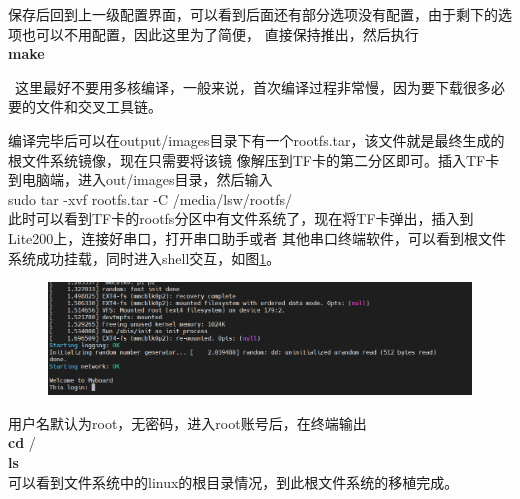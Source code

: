保存后回到上一级配置界面，可以看到后面还有部分选项没有配置，由于剩下的选项也可以不用配置，因此这里为了简便，
直接保持推出，然后执行\\
\textbf{make}
\begin{tcolorbox}[colback=red!5!white,colframe=red!75!black]
	\faWarning\  
	这里最好不要用多核编译，一般来说，首次编译过程非常慢，因为要下载很多必要的文件和交叉工具链。
\end{tcolorbox}
编译完毕后可以在output/images目录下有一个rootfs.tar，该文件就是最终生成的根文件系统镜像，现在只需要将该镜
像解压到TF卡的第二分区即可。插入TF卡到电脑端，进入out/images目录，然后输入\\
sudo tar -xvf rootfs.tar -C  /media/lsw/rootfs/ \\
此时可以看到TF卡的rootfs分区中有文件系统了，现在将TF卡弹出，插入到Lite200上，连接好串口，打开串口助手或者
其他串口终端软件，可以看到根文件系统成功挂载，同时进入shell交互，如图\ref{fig:rootfssatrt}。
\begin{figure}[htbp]
	\centering
	\includegraphics[width=1\linewidth]{chapter2/img/rootfssatrt}
	\caption{}
	\label{fig:rootfssatrt}
\end{figure}
用户名默认为root，无密码，进入root账号后，在终端输出\\
\textbf{cd} /\\
\textbf{ls} \\
可以看到文件系统中的linux的根目录情况，到此根文件系统的移植完成。
















